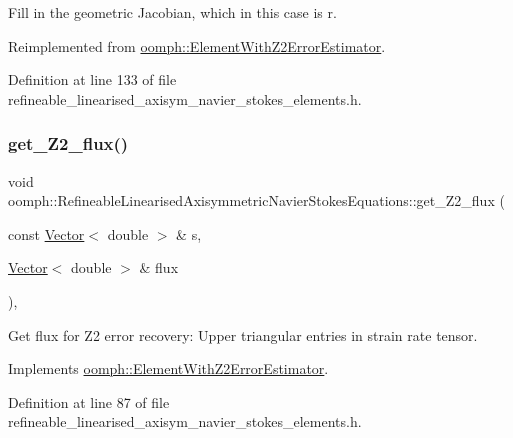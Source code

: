 Fill in the geometric Jacobian, which in this case is r. 



Reimplemented from \hyperlink{classoomph_1_1ElementWithZ2ErrorEstimator_ad2add457436f34d0d4b9e48900be309c}{oomph\+::\+Element\+With\+Z2\+Error\+Estimator}.



Definition at line 133 of file refineable\+\_\+linearised\+\_\+axisym\+\_\+navier\+\_\+stokes\+\_\+elements.\+h.

\mbox{\label{classoomph_1_1RefineableLinearisedAxisymmetricNavierStokesEquations_ad15973ab4c2e2a53c6356b70ef954958}} 
\subsubsection{\texorpdfstring{get\+\_\+\+Z2\+\_\+flux()}{get\_Z2\_flux()}}
{\footnotesize\ttfamily void oomph\+::\+Refineable\+Linearised\+Axisymmetric\+Navier\+Stokes\+Equations\+::get\+\_\+\+Z2\+\_\+flux (\begin{DoxyParamCaption}\item[{const \hyperlink{classoomph_1_1Vector}{Vector}$<$ double $>$ \&}]{s,  }\item[{\hyperlink{classoomph_1_1Vector}{Vector}$<$ double $>$ \&}]{flux }\end{DoxyParamCaption})\hspace{0.3cm}{\ttfamily [inline]}, {\ttfamily [virtual]}}



Get \textquotesingle{}flux\textquotesingle{} for Z2 error recovery\+: Upper triangular entries in strain rate tensor. 



Implements \hyperlink{classoomph_1_1ElementWithZ2ErrorEstimator_a5688ff5f546d81771cabad82ca5a7556}{oomph\+::\+Element\+With\+Z2\+Error\+Estimator}.



Definition at line 87 of file refineable\+\_\+linearised\+\_\+axisym\+\_\+navier\+\_\+stokes\+\_\+elements.\+h.



